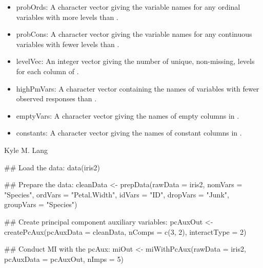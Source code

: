 \documentclass[letterpaper]{book}
\begin{document}
\begin{Value}
\begin{itemize}
\item probOrds: 
A character vector giving the variable names for any ordinal
variables with more levels than .

\item probCons: 
A character vector giving the variable names for any continuous
variables with fewer levels than .

\item levelVec: 
An integer vector giving the number of unique, non-missing, levels
for each column of .

\item highPmVars: 
A character vector containing the names of variables with fewer
observed responses than .

\item emptyVars: 
A character vector giving the names of empty columns in
.

\item constants: 
A character vector giving the names of constant columns in
.


\end{itemize}

\end{Value}
%
\begin{Author}\relax
Kyle M. Lang
\end{Author}
%
\begin{SeeAlso}\relax
{}
\end{SeeAlso}
%
\begin{Examples}
\begin{ExampleCode}
## Load the data:
data(iris2)

## Prepare the data:
cleanData <- prepData(rawData   = iris2,
                      nomVars   = "Species",
                      ordVars   = "Petal.Width",
                      idVars    = "ID",
                      dropVars  = "Junk",
                      groupVars = "Species")

## Create principal component auxiliary variables:
pcAuxOut <- createPcAux(pcAuxData    = cleanData,
                        nComps       = c(3, 2),
                        interactType = 2)

## Conduct MI with the pcAux:
miOut <- miWithPcAux(rawData = iris2, pcAuxData = pcAuxOut, nImps = 5)
\end{ExampleCode}
\end{Examples}
\end{document}
